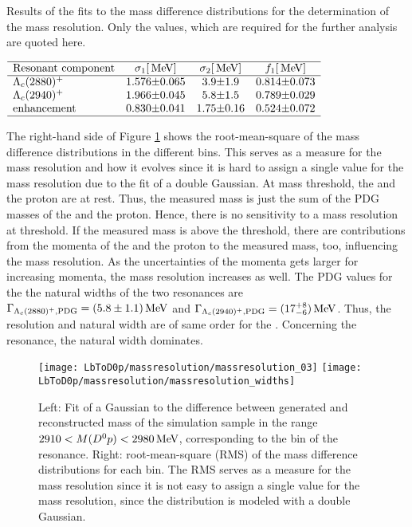 \begin{table}[tbp]
    \centering
    \caption{Results of the fits to the mass difference distributions for the determination of the mass resolution. Only the values, which are required for the further analysis are quoted here.}
    \label{tab:Massresolution}
    $\begin{array}{lr@{\pm}lr@{\pm}lr@{\pm}l}
    \hline
    \text{Resonant component} & \multicolumn{2}{c}{\sigma_1 [\mev]} & \multicolumn{2}{c}{\sigma_2 [\mev]} & \multicolumn{2}{c}{f_1 [\mev]} \\
    \hline
    \LcResI   & \MassresResIwIval & \MassresResIwIerr & \MassresResIwIIval & \MassresResIwIIerr & \MassresResIfIval & \MassresResIfIerr \\
    \LcResII   & \MassresResIIwIval & \MassresResIIwIerr & \MassresResIIwIIval & \MassresResIIwIIerr & \MassresResIIfIval & \MassresResIIfIerr \\
    \text{enhancement} & \MassresStructurewIval & \MassresStructurewIerr & \MassresStructurewIIval & \MassresStructurewIIerr & \MassresStructurefIval & \MassresStructurefIerr \\
    \hline
    \end{array}$
\end{table}
The right-hand side of Figure \ref{fig:massresolution} shows the root-mean-square of the mass difference distributions in the different bins.
This serves as a measure for the mass resolution and how it evolves since it is hard to assign a single value for the mass resolution due to the fit of a double Gaussian.
At \Dz\proton mass threshold, the \Dz and the proton are at rest.
Thus, the measured \Dz\proton mass is just the sum of the PDG masses of the \Dz and the proton.
Hence, there is no sensitivity to a mass resolution at threshold.
If the measured \Dz\proton mass is above the threshold, there are contributions from the momenta of the \Dz and the proton to the measured \Dz\proton mass, too, influencing the mass resolution.
As the uncertainties of the momenta gets larger for increasing momenta, the mass resolution increases as well.
The PDG values for the the natural widths of the two resonances are $\Gamma_{{\Lambda}_{c}(2880)^+, \text{PDG}} = (5.8 \pm 1.1)\mathrm{\,Me\kern -0.1em V}$ and $\Gamma_{{\Lambda}_{c}(2940)^+, \text{PDG}} = (17^{+8}_{-6})\mathrm{\,Me\kern -0.1em V}$.
Thus, the resolution and natural width are of same order for the \LcResI.
Concerning the \LcResII resonance, the natural width dominates.
\begin{figure}[tbp]
    \centering
	\texttt{[image: LbToD0p/massresolution/massresolution\_03]}
	\texttt{[image: LbToD0p/massresolution/massresolution\_widths]}
	\caption{Left: Fit of a Gaussian to the difference between generated and reconstructed \Dz\proton mass of the simulation sample in the range $2910 < M({{D}^0}{p}) < 2980 \mathrm{\,Me\kern -0.1em V}$, corresponding to the bin of the \LcResII resonance. Right: root-mean-square (RMS) of the mass difference distributions for each bin.
    The RMS serves as a measure for the mass resolution since it is not easy to assign a single value for the mass resolution, since the distribution is modeled with a double Gaussian.}
    \label{fig:massresolution}
\end{figure}


